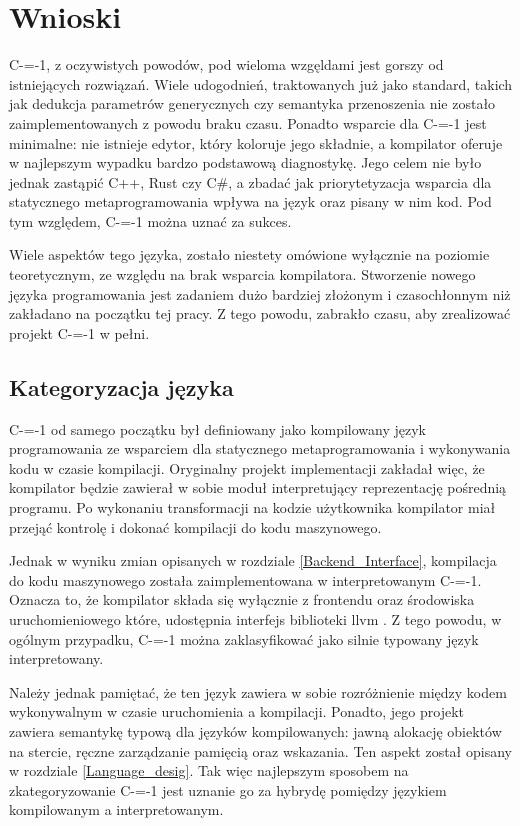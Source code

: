\section{Wnioski}

C-=-1, z oczywistych powodów, pod wieloma wzgęldami jest gorszy od istniejących rozwiązań.
Wiele udogodnień, traktowanych już jako standard, takich jak dedukcja parametrów generycznych czy semantyka przenoszenia nie zostało zaimplementowanych z powodu braku czasu.
Ponadto wsparcie dla C-=-1 jest minimalne: nie istnieje edytor, który koloruje jego składnie, a kompilator oferuje w najlepszym wypadku bardzo podstawową diagnostykę.
Jego celem nie było jednak zastąpić C++, Rust czy C\#, a zbadać jak priorytetyzacja wsparcia dla statycznego metaprogramowania wpływa na język oraz pisany w nim kod. 
Pod tym względem, C-=-1 można uznać za sukces.

Wiele aspektów tego języka, zostało niestety omówione wyłącznie na poziomie teoretycznym, ze względu na brak wsparcia kompilatora.
Stworzenie nowego języka programowania jest zadaniem dużo bardziej złożonym i czasochłonnym niż zakładano na początku tej pracy.
Z tego powodu, zabrakło czasu, aby zrealizować projekt C-=-1 w pełni.


\subsection{Kategoryzacja języka}

C-=-1 od samego początku był definiowany jako kompilowany język programowania ze wsparciem dla statycznego metaprogramowania i wykonywania kodu w czasie kompilacji.
Oryginalny projekt implementacji zakładał więc, że kompilator będzie zawierał w sobie moduł interpretujący reprezentację pośrednią programu.
Po wykonaniu transformacji na kodzie użytkownika kompilator miał przejąć kontrolę i dokonać kompilacji do kodu maszynowego.

Jednak w wyniku zmian opisanych w rozdziale \ref{Backend_Interface}, kompilacja do kodu maszynowego została zaimplementowana w interpretowanym C-=-1.
Oznacza to, że kompilator składa się wyłącznie z frontendu oraz środowiska uruchomieniowego które, udostępnia interfejs biblioteki llvm \cite{lattner2008llvm}.
Z tego powodu, w ogólnym przypadku, C-=-1 można zaklasyfikować jako silnie typowany język interpretowany.

Należy jednak pamiętać, że ten język zawiera w sobie rozróżnienie między kodem wykonywalnym w czasie uruchomienia a kompilacji.
Ponadto, jego projekt zawiera semantykę typową dla języków kompilowanych: jawną alokację obiektów na stercie, ręczne zarządzanie pamięcią oraz wskazania. 
Ten aspekt został opisany w rozdziale \ref{Language_desig}.
Tak więc najlepszym sposobem na zkategoryzowanie C-=-1 jest uznanie go za hybrydę pomiędzy językiem kompilowanym a interpretowanym.


